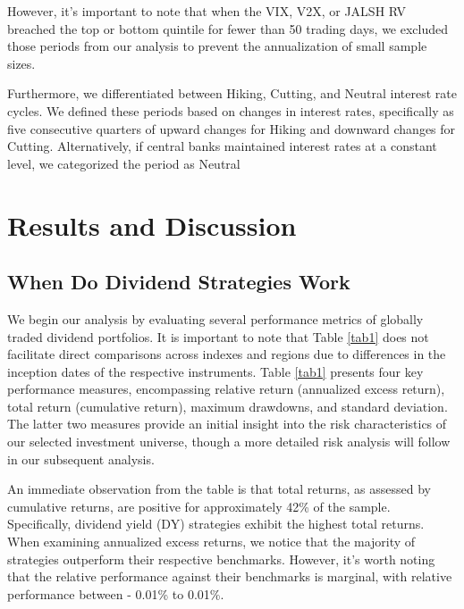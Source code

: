 \documentclass[11pt,preprint, authoryear]{elsarticle}
\numberwithin{equation}{section}
\numberwithin{figure}{section}
\numberwithin{table}{section}
\begin{document}
However, it's important to note that when the VIX, V2X, or JALSH RV
breached the top or bottom quintile for fewer than 50 trading days, we
excluded those periods from our analysis to prevent the annualization of
small sample sizes.

Furthermore, we differentiated between Hiking, Cutting, and Neutral
interest rate cycles. We defined these periods based on changes in
interest rates, specifically as five consecutive quarters of upward
changes for Hiking and downward changes for Cutting. Alternatively, if
central banks maintained interest rates at a constant level, we
categorized the period as Neutral

\hypertarget{results-and-discussion}{%
\section*{Results and Discussion}\label{results-and-discussion}}

\hypertarget{when-do-dividend-strategies-work}{%
\subsection*{When Do Dividend Strategies
Work}\label{when-do-dividend-strategies-work}}

We begin our analysis by evaluating several performance metrics of
globally traded dividend portfolios. It is important to note that Table
\ref{tab1} does not facilitate direct comparisons across indexes and
regions due to differences in the inception dates of the respective
instruments. Table \ref{tab1} presents four key performance measures,
encompassing relative return (annualized excess return), total return
(cumulative return), maximum drawdowns, and standard deviation. The
latter two measures provide an initial insight into the risk
characteristics of our selected investment universe, though a more
detailed risk analysis will follow in our subsequent analysis.

An immediate observation from the table is that total returns, as
assessed by cumulative returns, are positive for approximately 42\% of
the sample. Specifically, dividend yield (DY) strategies exhibit the
highest total returns. When examining annualized excess returns, we
notice that the majority of strategies outperform their respective
benchmarks. However, it's worth noting that the relative performance
against their benchmarks is marginal, with relative performance between
- 0.01\% to 0.01\%.
\end{document}
